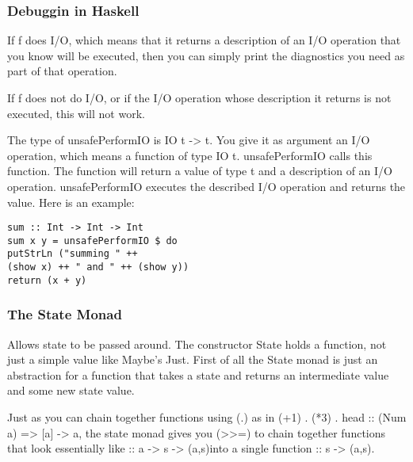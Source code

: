 \subsubsection{Debuggin in Haskell}
\begin{compactitem}
\item If f does I/O, which means that it returns a
description of an I/O operation that you know
will be executed, then you can simply print the
diagnostics you need as part of that operation.
\item If f does not do I/O, or if the I/O operation
whose description it returns is not executed,
this will not work.
\item The type of unsafePerformIO is IO t -> t. You give it as argument an I/O operation, which means a function of type IO t.
unsafePerformIO calls this function. The function will return a value of type t and
a description of an I/O operation. unsafePerformIO executes the described I/O
operation and returns the value.
Here is an example:
\begin{lstlisting}
sum :: Int -> Int -> Int
sum x y = unsafePerformIO $ do
putStrLn ("summing " ++
(show x) ++ " and " ++ (show y))
return (x + y)
\end{lstlisting}
\end{compactitem}

\subsubsection{The State Monad}
Allows state to be passed around. The constructor State holds a function, not just a simple value like Maybe’s Just. First of all the State monad is just an abstraction for a function that takes a state and returns an intermediate value and some new state value. 

Just as you can chain together functions using (.) as in (+1) . (*3) . head :: (Num a) => [a] -> a, the state monad gives you (>>=) to chain together functions that look essentially like :: a -> s -> (a,s)into a single function :: s -> (a,s).

